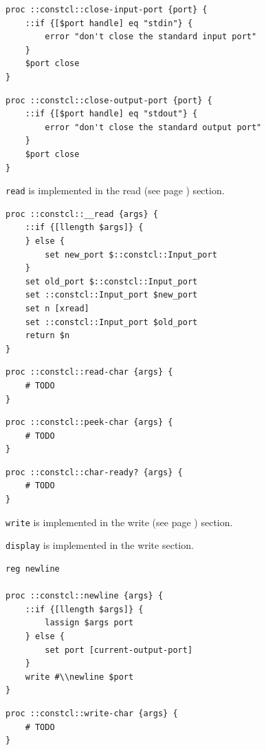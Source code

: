 \documentclass[twoside,9pt]{report}
\begin{document}
\noindent\makebox[\linewidth]{\rule{\linewidth}{0.4pt}}
\noindent\makebox[\linewidth]{\rule{\linewidth}{0.4pt}}
\begin{lstlisting}
proc ::constcl::close-input-port {port} {
    ::if {[$port handle] eq "stdin"} {
        error "don't close the standard input port"
    }
    $port close
}
\end{lstlisting}
\noindent\makebox[\linewidth]{\rule{\linewidth}{0.4pt}}
\noindent\makebox[\linewidth]{\rule{\linewidth}{0.4pt}}
\begin{lstlisting}
proc ::constcl::close-output-port {port} {
    ::if {[$port handle] eq "stdout"} {
        error "don't close the standard output port"
    }
    $port close
}
\end{lstlisting}
\noindent\makebox[\linewidth]{\rule{\linewidth}{0.4pt}}

\texttt{read} is implemented in the read (see page \pageref{read}) section.

\noindent\makebox[\linewidth]{\rule{\linewidth}{0.4pt}}
\begin{lstlisting}
proc ::constcl::__read {args} {
    ::if {[llength $args]} {
    } else {
        set new_port $::constcl::Input_port
    }
    set old_port $::constcl::Input_port
    set ::constcl::Input_port $new_port
    set n [xread]
    set ::constcl::Input_port $old_port
    return $n
}
\end{lstlisting}
\noindent\makebox[\linewidth]{\rule{\linewidth}{0.4pt}}
\noindent\makebox[\linewidth]{\rule{\linewidth}{0.4pt}}
\begin{lstlisting}
proc ::constcl::read-char {args} {
    # TODO
}
\end{lstlisting}
\noindent\makebox[\linewidth]{\rule{\linewidth}{0.4pt}}
\noindent\makebox[\linewidth]{\rule{\linewidth}{0.4pt}}
\begin{lstlisting}
proc ::constcl::peek-char {args} {
    # TODO
}
\end{lstlisting}
\noindent\makebox[\linewidth]{\rule{\linewidth}{0.4pt}}
\noindent\makebox[\linewidth]{\rule{\linewidth}{0.4pt}}
\begin{lstlisting}
proc ::constcl::char-ready? {args} {
    # TODO
}
\end{lstlisting}
\noindent\makebox[\linewidth]{\rule{\linewidth}{0.4pt}}

\texttt{write} is implemented in the write (see page \pageref{write}) section.


\texttt{display} is implemented in the write section.

\noindent\makebox[\linewidth]{\rule{\linewidth}{0.4pt}}
\begin{lstlisting}
reg newline
 
proc ::constcl::newline {args} {
    ::if {[llength $args]} {
        lassign $args port
    } else {
        set port [current-output-port]
    }
    write #\\newline $port
}
\end{lstlisting}
\noindent\makebox[\linewidth]{\rule{\linewidth}{0.4pt}}
\noindent\makebox[\linewidth]{\rule{\linewidth}{0.4pt}}
\begin{lstlisting}
proc ::constcl::write-char {args} {
    # TODO
}
\end{lstlisting}
\noindent\makebox[\linewidth]{\rule{\linewidth}{0.4pt}}
\end{document}
